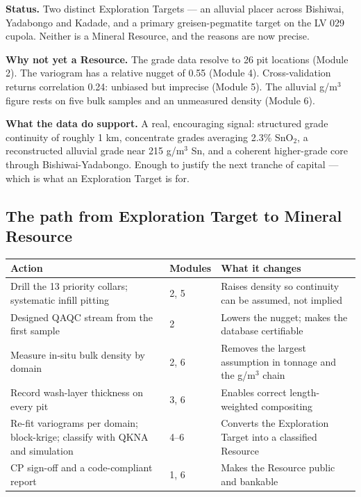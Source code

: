 \documentclass[11pt]{article}
\begin{document}
\begin{torobox}
\textbf{Status.} Two distinct Exploration Targets --- an alluvial placer
across Bishiwai, Yadabongo and Kadade, and a primary greisen-pegmatite
target on the LV 029 cupola. Neither is a Mineral Resource, and the
reasons are now precise.

\textbf{Why not yet a Resource.} The grade data resolve to 26 pit
locations (Module 2). The variogram has a relative nugget of 0.55
(Module 4). Cross-validation returns correlation 0.24: unbiased but
imprecise (Module 5). The alluvial g/m$^3$ figure rests on five bulk
samples and an unmeasured density (Module 6).

\textbf{What the data do support.} A real, encouraging signal: structured
grade continuity of roughly 1 km, concentrate grades averaging 2.3\%
SnO$_2$, a reconstructed alluvial grade near 215 g/m$^3$ Sn, and a
coherent higher-grade core through Bishiwai-Yadabongo. Enough to justify
the next tranche of capital --- which is what an Exploration Target is
for.
\end{torobox}

\subsection*{The path from Exploration Target to Mineral Resource}

\begin{center}\small
\begin{tabular}{@{}p{6.4cm}lp{6cm}@{}}
\toprule
\textbf{Action} & \textbf{Modules} & \textbf{What it changes}\\
\midrule
Drill the 13 priority collars; systematic infill pitting & 2, 5 &
Raises density so continuity can be assumed, not implied\\
Designed QAQC stream from the first sample & 2 & Lowers the nugget;
makes the database certifiable\\
Measure in-situ bulk density by domain & 2, 6 & Removes the largest
assumption in tonnage and the g/m$^3$ chain\\
Record wash-layer thickness on every pit & 3, 6 & Enables correct
length-weighted compositing\\
Re-fit variograms per domain; block-krige; classify with QKNA and
simulation & 4--6 & Converts the Exploration Target into a classified
Resource\\
CP sign-off and a code-compliant report & 1, 6 & Makes the Resource
public and bankable\\
\bottomrule
\end{tabular}
\end{center}
\end{document}
